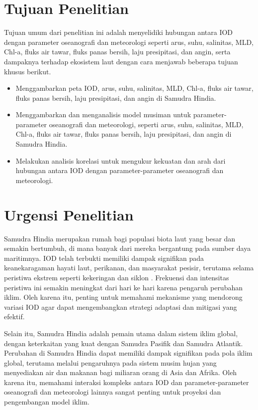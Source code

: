 \begin{spacing}{1.5}
	\section[Tujuan Penelitian]{Tujuan Penelitian}
	
	Tujuan umum dari penelitian ini adalah menyelidiki hubungan antara IOD dengan parameter oseanografi dan meteorologi seperti arus, suhu, salinitas, MLD, Chl-a, fluks air tawar, fluks panas bersih, laju presipitasi, dan angin, serta dampaknya terhadap ekosistem laut dengan cara menjawab beberapa tujuan khusus berikut.
	
	\begin{itemize}
		\item Menggambarkan peta IOD, arus, suhu, salinitas, MLD, Chl-a, fluks air tawar, fluks panas bersih, laju presipitasi, dan angin di Samudra Hindia.
		\item Menggambarkan dan menganalisis model musiman untuk parameter-parameter oseanografi dan meteorologi, seperti arus, suhu, salinitas, MLD, Chl-a, fluks air tawar, fluks panas bersih, laju presipitasi, dan angin di Samudra Hindia.
		\item Melakukan analisis korelasi untuk mengukur kekuatan dan arah dari hubungan antara IOD dengan parameter-parameter oseanografi dan meteorologi.
	\end{itemize}
	\section[Urgensi Penelitian]{Urgensi Penelitian}

	Samudra Hindia merupakan rumah bagi populasi biota laut yang besar dan semakin bertumbuh, di mana banyak dari mereka bergantung pada sumber daya maritimnya. IOD telah terbukti memiliki dampak signifikan pada keanekaragaman hayati laut, perikanan, dan masyarakat pesisir, terutama selama peristiwa ekstrem seperti kekeringan \cite{Pan2018} dan siklon \cite{Wahiduzzaman2022}. Frekuensi dan intensitas peristiwa ini semakin meningkat dari hari ke hari karena pengaruh perubahan iklim. Oleh karena itu, penting untuk memahami mekanisme yang mendorong variasi IOD agar dapat mengembangkan strategi adaptasi dan mitigasi yang efektif.
	
	Selain itu, Samudra Hindia adalah pemain utama dalam sistem iklim global, dengan keterkaitan yang kuat dengan Samudra Pasifik dan Samudra Atlantik. Perubahan di Samudra Hindia dapat memiliki dampak signifikan pada pola iklim global, terutama melalui pengaruhnya pada sistem musim hujan yang menyediakan air dan makanan bagi miliaran orang di Asia dan Afrika. Oleh karena itu, memahami interaksi kompleks antara IOD dan parameter-parameter oseanografi dan meteorologi lainnya sangat penting untuk proyeksi dan pengembangan model iklim.
	

\end{spacing}
